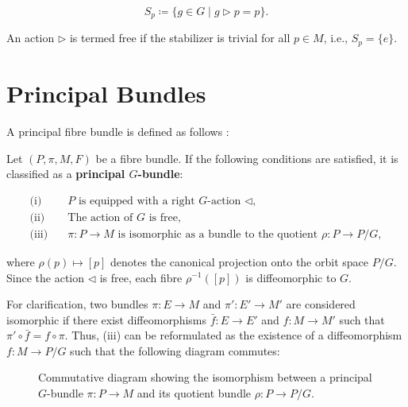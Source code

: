 \[
S_p \coloneqq \{g \in G \mid g \triangleright p = p \}.
\]

An action \(\triangleright\) is termed free if the stabilizer is trivial for all \(p \in M\), i.e., \(S_p = \{e\}\).


\section{Principal Bundles}

A principal fibre bundle is defined as follows \cite{FredericSchullerPrincipalfibrebundlesLec19FredericSchuller2015}:

Let \( (P, \pi, M, F) \) be a fibre bundle. If the following conditions are satisfied, it is classified as a \textbf{principal \( G \)-bundle}:

\begin{align*}
  \text{(i)}\quad & P \text{ is equipped with a right } G\text{-action } \triangleleft, \\
  \text{(ii)}\quad & \text{The action of } G \text{ is free}, \\
  \text{(iii)}\quad & \pi : P \to M \text{ is isomorphic as a bundle to the quotient } \rho : P \to P/G,
\end{align*}

where \( \rho(p) \mapsto [p] \) denotes the canonical projection onto the orbit space \( P/G \). Since the action \( \triangleleft \) is free, each fibre \( \rho^{-1}([p]) \) is diffeomorphic to \( G \).

For clarification, two bundles \( \pi: E \to M \) and \( \pi': E' \to M' \) are considered isomorphic if there exist diffeomorphisms \( \bar{f}: E \to E' \) and \( f: M \to M' \) such that \( \pi' \circ \bar{f} = f \circ \pi \). Thus, (iii) can be reformulated as the existence of a diffeomorphism \( f : M \to P/G \) such that the following diagram commutes:
\begin{figure}[h!]
\centering
{}
\caption{Commutative diagram showing the isomorphism between a principal $G$-bundle \(\pi : P \to M\) and its quotient bundle \(\rho : P \to P/G\).}
\end{figure}


